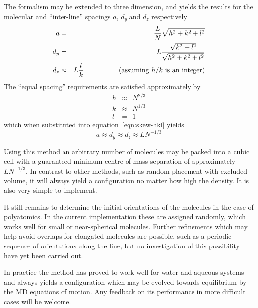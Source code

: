 The formalism may be extended to three dimension, and yields the
results for the molecular and ``inter-line'' spacings $a$, $d_y$ and
$d_z$ respectively
\begin{eqnarray}
\label{eqn:skew-hkl}
\nonumber
a & = & \frac{L}{N}\sqrt{h^2+k^2+l^2}\\
d_y  & = & L \frac{\sqrt{k^2+l^2}}{\sqrt{h^2+k^2+l^2}} \\
d_z & \approx & L\frac{l}{k} \mbox{\hspace{5em}(assuming $h/k$ is an integer)}
\nonumber
\end{eqnarray}
The ``equal spacing'' requirements are satisfied approximately by
\begin{eqnarray}
\nonumber
h & \approx & N^{2/3} \\
k & \approx & N^{1/3} \\
\nonumber
l & = & 1
\end{eqnarray}
which when substituted into equation~\ref{eqn:skew-hkl} yields
\begin{equation}
a \approx d_y \approx d_z \approx LN^{-1/3}
\end{equation}

Using this method an arbitrary number of molecules may be packed into
a cubic cell with a guaranteed minimum centre-of-mass separation of
approximately $LN^{-1/3}$.  In contrast to other methods, such as
random placement with excluded volume, it will always yield a
configuration no matter how high the density.  It is also very simple
to implement.

It still remains to determine the initial orientations of the
molecules in the case of polyatomics.  In the current implementation
these are assigned randomly, which works well for small or
near-spherical molecules.  Further refinements which may help avoid
overlaps for elongated molecules are possible, such as a periodic
sequence of orientations along the line, but no investigation of this
possibility have yet been carried out.

In practice the method has proved to work well for water and aqueous
systems and always yields a configuration which may be evolved towards
equilibrium by the MD equations of motion.  Any feedback on its
performance in more difficult cases will be welcome.

